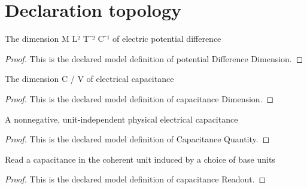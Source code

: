 \section{Declaration topology}
\begin{definition}
  \label{def:physics:phyx-mini-0877:phyxminiproblems-problemphyxmini0877-potentialdifferencedimension}
  The dimension M L² T⁻² C⁻¹ of electric potential difference
\end{definition}
\begin{proof}
  This is the declared model definition of potential Difference Dimension.
\end{proof}
\begin{definition}
  \label{def:physics:phyx-mini-0877:phyxminiproblems-problemphyxmini0877-capacitancedimension}
  The dimension C / V of electrical capacitance
\end{definition}
\begin{proof}
  This is the declared model definition of capacitance Dimension.
\end{proof}
\begin{definition}
  \label{def:physics:phyx-mini-0877:phyxminiproblems-problemphyxmini0877-capacitancequantity}
  A nonnegative, unit-independent physical electrical capacitance
\end{definition}
\begin{proof}
  This is the declared model definition of Capacitance Quantity.
\end{proof}
\begin{definition}
  \label{def:physics:phyx-mini-0877:phyxminiproblems-problemphyxmini0877-capacitancereadout}
  Read a capacitance in the coherent unit induced by a choice of base units
\end{definition}
\begin{proof}
  This is the declared model definition of capacitance Readout.
\end{proof}
